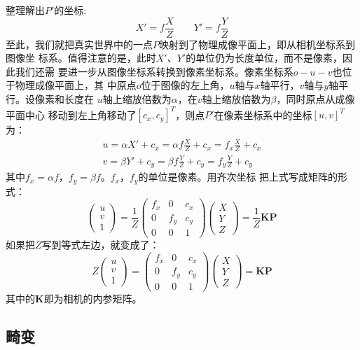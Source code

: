 \documentclass[11pt]{article}
\begin{document}
整理解出$P'$的坐标:
\begin{equation}
    X' = f\frac{X}{Z}
    \qquad
    Y' = f\frac{Y}{Z}
\end{equation}
至此，我们就把真实世界中的一点$P$映射到了物理成像平面上，即从相机坐标系到图像坐
标系。值得注意的是，此时$X'$、$Y'$的单位仍为长度单位，而不是像素，因此我们还需
要进一步从图像坐标系转换到像素坐标系。像素坐标系$o-u-v$也位于物理成像平面上，其
中原点$o$位于图像的左上角，$u$轴与$x$轴平行，$v$轴与$y$轴平行。设像素和长度在
$u$轴上缩放倍数为$\alpha$，在$v$轴上缩放倍数为$\beta$，同时原点从成像平面中心
移动到左上角移动了$[c_x, c_y]^T$，则点$P'$在像素坐标系中的坐标$[u,v]^T$为：
\begin{equation}
    \begin{split}
    u = \alpha X' + c_x = \alpha f\frac{X}{Z}+c_x = f_x\frac{X}{Z}+c_x
    \\
    v = \beta Y' + c_y = \beta f\frac{Y}{Z}+c_y = f_y\frac{Y}{Z}+c_y
    \end{split}
\end{equation}
其中$f_x=\alpha f$，$f_y = \beta f$。$f_x$，$f_y$的单位是像素。用齐次坐标
把上式写成矩阵的形式：
\begin{equation}
    \begin{pmatrix}
        u \\ v \\ 1
    \end{pmatrix}
    =
    \frac{1}{Z}
    \begin{pmatrix}
        f_x & 0 & c_x  \\
        0 & f_y & c_y  \\
        0 & 0 & 1
    \end{pmatrix}
    \begin{pmatrix}
        X \\ Y \\ Z
    \end{pmatrix}
    =
    \frac{1}{Z}\mathbf{K}\mathbf{P}
\end{equation}
如果把$Z$写到等式左边，就变成了：
\begin{equation}
    Z
    \begin{pmatrix}
        u \\ v \\ 1
    \end{pmatrix}
    =
    \begin{pmatrix}
        f_x & 0 & c_x  \\
        0 & f_y & c_y  \\
        0 & 0 & 1
    \end{pmatrix}
    \begin{pmatrix}
        X \\ Y \\ Z
    \end{pmatrix}
    =
    \mathbf{K}\mathbf{P}
\end{equation}
其中的$\mathbf{K}$即为相机的内参矩阵。

\subsection{畸变}
\end{document}
